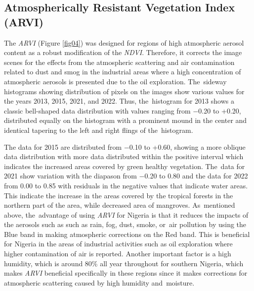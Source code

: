 \documentclass[jmse,article,accept,pdftex,moreauthors]{Definitions/mdpi}
\begin{document}
\subsection{Atmospherically Resistant Vegetation Index (ARVI)}

The \emph{ARVI} (Figure \ref{fig04}) was designed for regions of high atmospheric aerosol content as a robust modification of the \emph{NDVI}. Therefore, it corrects the image scenes for the effects from the atmospheric scattering and air contamination related to dust and smog in the industrial areas where a high concentration of atmospheric aerosols is presented due to the oil exploration. The~sideway histograms showing distribution of pixels on the images show various values for the years 2013, 2015, 2021, and 2022. Thus, the~histogram for 2013 shows a classic bell-shaped data distribution with values ranging from $-$0.20 to +0.20, distributed equally on the histogram with a prominent mound in the center and identical tapering to the left and right flings of the~histogram. 

The data for 2015 are distributed from $-$0.10 to +0.60, showing a more oblique data distribution with more data distributed within the positive interval which indicates the increased areas covered by green healthy vegetation. The~data for 2021 show variation with the diapason from $-$0.20 to 0.80 and the data for 2022 from 0.00 to 0.85 with residuals in the negative values that indicate water areas. This indicate the increase in the areas covered by the tropical forests in the northern part of the area, while decreased area of mangroves. As~mentioned above, the~advantage of using \emph{ARVI} for Nigeria is that it reduces the impacts of the aerosols such as such as rain, fog, dust, smoke, or~air pollution by using the Blue band in making atmospheric corrections on the Red band. This is beneficial for Nigeria in the areas of industrial activities such as oil exploration where higher contamination of air is reported. Another important factor is a high humidity, which is around 80\% all year throughout for southern Nigeria, which makes \emph{ARVI} beneficial specifically in these regions since it makes corrections for atmospheric scattering caused by high humidity and~moisture.
\end{document}
